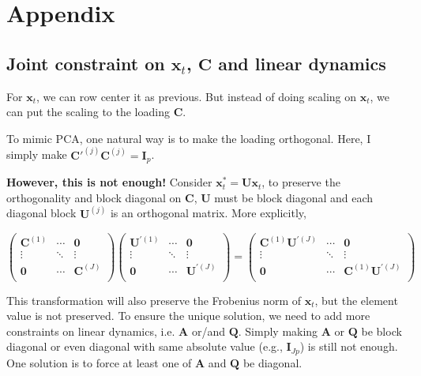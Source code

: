 \documentclass[]{article}
\begin{document}
\clearpage
\section{Appendix}

\subsection{Joint constraint on $\mathbf{x}_t$, $\mathbf{C}$ and linear dynamics}
For $\mathbf{x}_t$, we can row center it as previous. But instead of doing scaling on $\bm{x}_t$, we can put the scaling to the loading $\mathbf{C}$.

To mimic PCA, one natural way is to make the loading orthogonal. Here, I simply make \(\mathbf{C}'^{(j)}\mathbf{C}^{(j)} = \mathbf{I}_{p}\).

\textbf{However, this is not enough!} Consider \(\mathbf{x}_{t}^{*} = \mathbf{Ux}_{t}\), to
preserve the orthogonality and block diagonal on \(\mathbf{C}\), \(\mathbf{U}\) must be
block diagonal and each diagonal block \(\mathbf{U}^{(j)}\) is an orthogonal matrix. More explicitly,

\[\begin{pmatrix}
	\mathbf{C}^{(1)} & \cdots & \mathbf{0} \\
	\vdots & \ddots & \vdots \\
	\mathbf{0} & \cdots & \mathbf{C}^{(J)} \\
\end{pmatrix}\begin{pmatrix}
	\mathbf{U}^{'(1)} & \cdots & \mathbf{0} \\
	\vdots & \ddots & \vdots \\
	\mathbf{0} & \cdots & \mathbf{U}^{'(J)} \\
\end{pmatrix} = \begin{pmatrix}
	\mathbf{C}^{(1)}\mathbf{U}^{'(J)} & \cdots & \mathbf{0} \\
	\vdots & \ddots & \vdots \\
	\mathbf{0} & \cdots & \mathbf{C}^{(1)}\mathbf{U}^{'(J)} \\
\end{pmatrix}\]

This transformation will also preserve the Frobenius norm of \(\mathbf{x}_{t}\),
but the element value is not preserved. To ensure the unique solution,
we need to add more constraints on linear dynamics, i.e. \(\mathbf{A}\) or/and
\(\mathbf{Q}\). Simply making \(\mathbf{A}\) or \(\mathbf{Q}\) be block diagonal or even diagonal
with same absolute value (e.g., \(\mathbf{I}_{Jp}\)) is still not enough. One solution is to force at least one of \(\mathbf{A}\) and \(\mathbf{Q}\) be diagonal.
\end{document}
